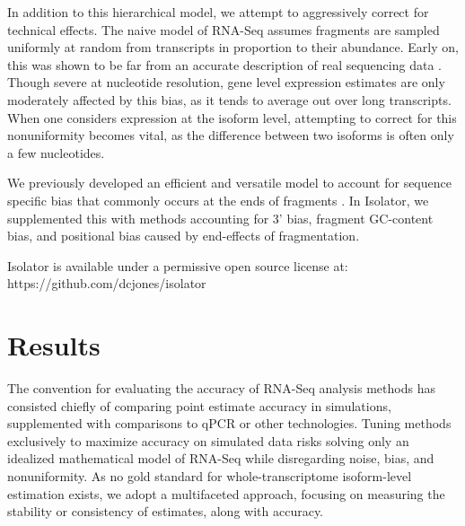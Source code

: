 \documentclass[twocolumn]{article}
\begin{document}
In addition to this hierarchical model, we attempt to aggressively correct for
technical effects. The naive model of RNA-Seq assumes fragments are sampled
uniformly at random from transcripts in proportion to their abundance. Early on,
this was shown to be far from an accurate description of real sequencing data
\cite{Hansen:2010if}. Though severe at nucleotide resolution, gene level
expression estimates are only moderately affected by this bias, as it tends to
average out over long transcripts. When one considers expression at the isoform
level, attempting to correct for this nonuniformity becomes vital, as the
difference between two isoforms is often only a few nucleotides.

We previously developed an efficient and versatile model to account for sequence
specific bias that commonly occurs at the ends of fragments \cite{Jones:2012hg}.
In Isolator, we supplemented this with methods accounting for 3' bias, fragment
GC-content bias, and positional bias caused by end-effects of fragmentation.

Isolator is available under a permissive open source license at:
https://github.com/dcjones/isolator

\section{Results}\label{results}

The convention for evaluating the accuracy of RNA-Seq analysis methods has
consisted chiefly of comparing point estimate accuracy in simulations,
supplemented with comparisons to qPCR or other technologies. Tuning methods
exclusively to maximize accuracy on simulated data risks solving only an
idealized mathematical model of RNA-Seq while disregarding noise, bias, and
nonuniformity. As no gold standard for whole-transcriptome isoform-level
estimation exists, we adopt a multifaceted approach, focusing on measuring
the stability or consistency of estimates, along with accuracy.
\end{document}
